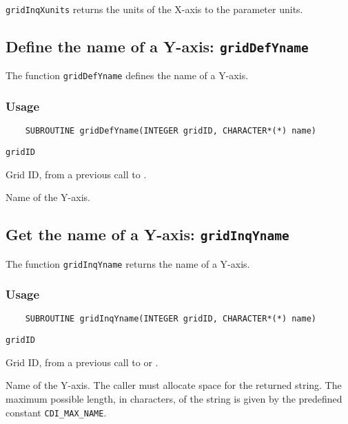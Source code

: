 {\tt gridInqXunits} returns the units of the X-axis to the parameter units.



\subsection{Define the name of a Y-axis: {\tt gridDefYname}}
\label{gridDefYname}

The function {\tt gridDefYname} defines the name of a Y-axis.

\subsubsection*{Usage}

\begin{verbatim}
    SUBROUTINE gridDefYname(INTEGER gridID, CHARACTER*(*) name)
\end{verbatim}

\hspace*{4mm}\begin{minipage}[]{15cm}
\begin{deflist}{\tt gridID\ }
\item[{\tt gridID}]
Grid ID, from a previous call to {}.
\item[{\tt name}]
Name of the Y-axis.

\end{deflist}
\end{minipage}


\subsection{Get the name of a Y-axis: {\tt gridInqYname}}
\label{gridInqYname}

The function {\tt gridInqYname} returns the name of a Y-axis.

\subsubsection*{Usage}

\begin{verbatim}
    SUBROUTINE gridInqYname(INTEGER gridID, CHARACTER*(*) name)
\end{verbatim}

\hspace*{4mm}\begin{minipage}[]{15cm}
\begin{deflist}{\tt gridID\ }
\item[{\tt gridID}]
Grid ID, from a previous call to {} or {}.
\item[{\tt name}]
Name of the Y-axis. The caller must allocate space for the
                    returned string. The maximum possible length, in characters, of
                    the string is given by the predefined constant {\tt CDI\_MAX\_NAME}.

\end{deflist}
\end{minipage}

